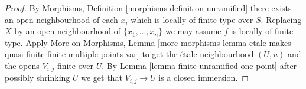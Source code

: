 \documentclass[10pt,a4paper]{amsart}
\theoremstyle{plain}
\theoremstyle{definition}
\theoremstyle{remark}
\numberwithin{equation}{subsection}
\begin{document}
\begin{proof}
By
Morphisms, Definition \ref{morphisms-definition-unramified}
there exists an open neighbourhood of each $x_i$ which is locally of finite
type over $S$. Replacing $X$ by an open neighbourhood of $\{x_1, \ldots, x_n\}$
we may assume $f$ is locally of finite type. Apply
More on Morphisms, Lemma
\ref{more-morphisms-lemma-etale-makes-quasi-finite-finite-multiple-points-var}
to get the \'etale neighbourhood $(U, u)$ and the opens $V_{i, j}$ finite over
$U$. By
Lemma \ref{lemma-finite-unramified-one-point}
after possibly shrinking $U$ we get that $V_{i, j} \to U$ is a closed
immersion.
\end{proof}
\end{document}
